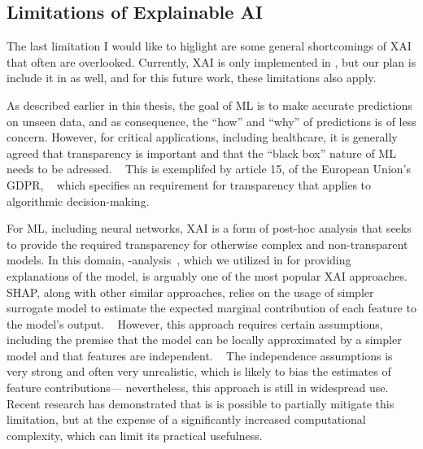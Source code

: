 \subsection{Limitations of Explainable AI}

The last limitation I would like to higlight are some general shortcomings
of \ac{XAI} that often are overlooked. Currently, \ac{XAI} is only implemented
in \studyii{}, but our plan is include it in \studyiii{} as well, and for 
this future work, these limitations also apply.

As described earlier in this thesis, 
the goal of \ac{ML} is to make accurate predictions on unseen data,
and as consequence, the \enquote{how} and \enquote{why} of predictions
is of less concern.
However, for critical applications, including healthcare, it is 
generally agreed that transparency is important and that 
the \enquote{black box} nature of \ac{ML} needs to be 
adressed. 
~\autocite{topolHighperformance2019}
This is exemplifed by article 15,
of the European Union's \ac{GDPR},
~\autocite{EuropeanParliament2016a}
which specifies an requirement for transparency that 
applies to algorithmic decision-making.%

For \ac{ML}, including neural networks, \ac{XAI} is a form of post-hoc
analysis that seeks to provide the required transparency for 
otherwise complex and non-transparent models.
In this domain, -analysis~\autocite{lundbergUnified2017},
which we utilized in \studyii{} 
for providing explanations of the  model,
is arguably one of the most popular \ac{XAI} approaches.
\ac{SHAP},
along with other similar approaches,
relies on the usage of simpler surrogate model
to estimate the expected marginal contribution
of each feature to the model's output.
~\autocite{bellePrinciples2021}
However, this approach requires certain assumptions,
including the premise that the model can be locally
approximated by a simpler model and that features
are independent.
~\autocite{lundbergUnified2017}
The independence assumptions is very strong and often very unrealistic,
which is likely to bias the estimates of feature contributions---%
nevertheless, this approach is still in widespread use.
Recent research has demonstrated that is is possible to partially mitigate
this limitation, but at the expense of a significantly increased computational
complexity, which can limit its practical usefulness.
\autocite{aasExplaining2021}

